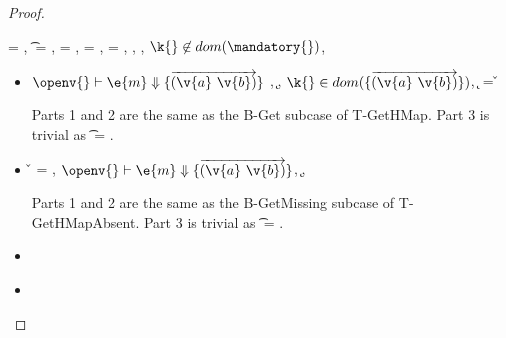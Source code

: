 \begin{lemma}
\begin{proof}
\begin{case}[T-GetHMapPartialDefault]
  \e{} = { {}},
  \t{} = \Top,
  \thenprop{\prop{}} = {\topprop{}},
  \elseprop{\prop{}} = {\topprop{}},
  \object{} = {\replacefor
               { {\x{}}}
                          {}
                          {\x{}}},
  \judgementtwo {\propenv{}} {} {},
 \judgement {\propenv{}} {} {\HMapp {\mandatory{}} {\absent}}
           { {}}
           {},
             ${\notinmandatory{\k{}}{\t{}}{\mandatory{}}}$,
             {\notinabsent{\k{}}{\absent{}}}

  \begin{itemize}
    \item[]
      \begin{subcase}[B-Get]
        $\opsem {\openv{}}
        {\e{m}} {\curlymap{\overrightarrow{({\v{a}}\ {\v{b}})}}}$
        ,
         \opsem {\openv{}}
                 {} {\k{}},
         $\keyinmap{\k{}}{\curlymap{\overrightarrow{({\v{a}}\ {\v{b}})}}}$,
          {\k{}} = {\v{}}

         Parts 1 and 2 are the same as the B-Get subcase of T-GetHMap.
         Part 3 is trivial as \t{} = \Top.


      \end{subcase}
    \item[]
      \begin{subcase}[B-GetMissing]
        \v{} = \nil,
        $\opsem {\openv{}}
        {\e{m}} {\curlymap{\overrightarrow{({\v{a}}\ {\v{b}})}}}$,
       \opsem {\openv{}} {} {\k{}},

         Parts 1 and 2 are the same as the B-GetMissing subcase of T-GetHMapAbsent.
         Part 3 is trivial as \t{} = \Top.

      \end{subcase}
    \item[]
      \begin{subcase}[BE-Get1]
      \end{subcase}
    \item[]
      \begin{subcase}[BE-Get2]
      \end{subcase}
  \end{itemize}
\end{case}


\end{proof}
\end{lemma}
